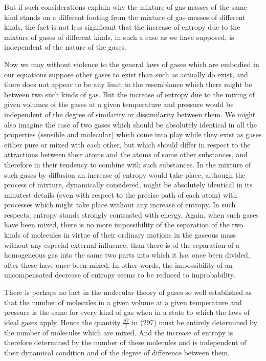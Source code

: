 \documentclass[12pt]{article}
\begin{document}
But if such considerations explain why the mixture of gas-masses of the same kind stands on a different footing from the mixture of gas-masses of different kinds, the fact is not less significant that the increase of entropy due to the mixture of gases of different kinds, in such a case as we have supposed, is independent of the nature of the gases.

Now we may without violence to the general laws of gases which are embodied in our equations suppose other gases to exist than such as actually do exist, and there does not appear to be any limit to the resemblance which there might be between two such kinds of gas. But the increase of entropy due to the mixing of given volumes of the gases at a given temperature and pressure would be independent of the degree of similarity or dissimilarity between them. We might also imagine the case of two gases which should be absolutely identical in all the properties (sensible and molecular) which come into play while they exist as gases either pure or mixed with each other, but which should differ in respect to the attractions between their atoms and the atoms of some other substances, and therefore in their tendency to combine with such substances. In the mixture of such gases by diffusion an increase of entropy would take place, although the process of mixture, dynamically considered, might be absolutely identical in its minutest details (even with respect to the precise path of each atom) with processes which might take place without any increase of entropy. In such respects, entropy stands strongly contrasted with energy. Again, when such gases have been mixed, there is no more impossibility of the separation of the two kinds of molecules in virtue of their ordinary motions in the gaseous mass without any especial external influence, than there is of the separation of a homogeneous gas into the same two parts into which it has once been divided, after these have once been mixed. In other words, the impossibility of an uncompensated decrease of entropy seems to be reduced to improbability. %


There is perhaps no fact in the molecular theory of gases so well established as that the number of molecules in a given volume at a given temperature and pressure is the same for every kind of gas when in a state to which the laws of ideal gases apply. Hence the quantity $\frac{pV}{t}$ in (297) must be entirely determined by the number of molecules which are mixed. And the increase of entropy is therefore determined by the number of these molecules and is independent of their dynamical condition and of the degree of difference between them.
\end{document}
